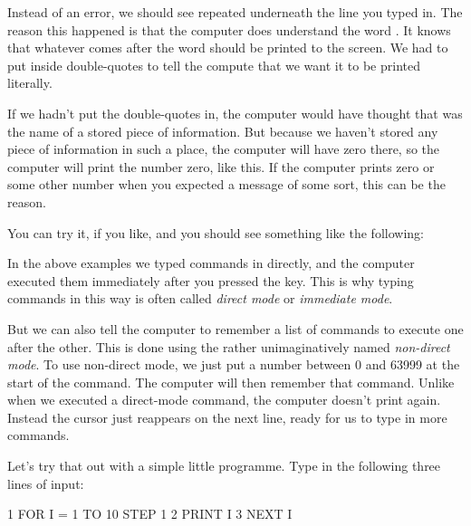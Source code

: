   Instead of an error, we should see  repeated underneath
  the line you typed in.  The reason this happened is that the computer
  does understand the word .  It knows that whatever comes after
  the word  should be printed to the screen.  We had to put  inside double-quotes to tell the compute that we want it to be
  printed literally.

  If we hadn't put the double-quotes in, the computer would have thought
  that  was the name of a stored piece of information.
  But because we haven't stored any piece of information in such a place,
  the computer will have zero there, so the computer will print the number
  zero, like this. If the computer prints zero or some other number when
  you expected a message of some sort, this can be the reason.

\needspace{4cm} %
  You can try it, if you like, and you should see something like the following:


  In the above examples we typed commands in directly, and the computer executed
  them immediately after you pressed the  key.  This is why
  typing commands in this way is often called {\em direct mode} or {\em immediate mode}.
  
  But we can also tell the computer to remember a list of commands to execute one
  after the other.   This is done using the rather unimaginatively named {\em non-direct mode}.
  To use non-direct mode, we just put a number between 0 and 63999 at the start of
  the command.  The computer will then remember that command.  Unlike when we executed
  a direct-mode command, the computer doesn't print  again. Instead the cursor
  just reappears on the next line, ready for us to type in more commands.

\needspace{4cm} %
  Let's try that out with a simple little programme.  Type in the following three lines of
  input:

\begin{screenoutput}
1 FOR I = 1 TO 10 STEP 1
2 PRINT I
3 NEXT I
\end{screenoutput}

